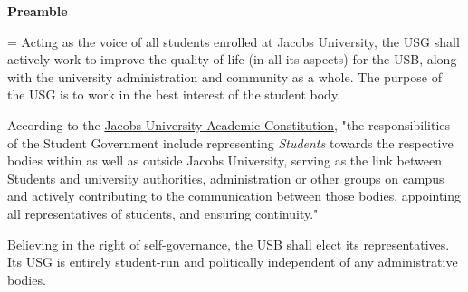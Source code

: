 \begin{center}
\textbf{Preamble}
\end{center}

{\parskip=\baselineskip
Acting as the voice of all students enrolled at Jacobs University, the \acf{USG} shall actively work to improve the quality of life (in all its aspects) for the \acf{USB}, along with the university administration and community as a whole. The purpose of the \acf{USG} is to work in the best interest of the student body.

According to the \href{https://usg.jacobs.university/wp-content/uploads/2018/02/Academic_Constitution_2017_english.pdf}{Jacobs University Academic Constitution}, "the responsibilities of the Student Government include representing \textit{Students} towards the respective bodies within as well as outside Jacobs University, serving as the link between Students and university authorities, administration or other groups on campus and actively contributing to the communication between those bodies, appointing all representatives of students, and ensuring continuity."


Believing in the right of self-governance, the \acf{USB} shall elect its representatives. Its \acf{USG} is entirely student-run and politically independent of any administrative bodies. 
}